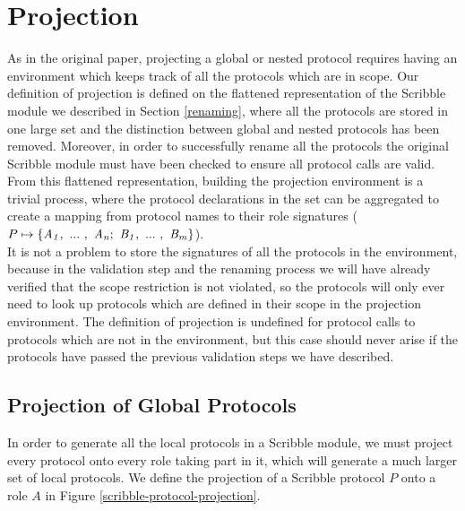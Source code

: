 \documentclass[12pt,twoside]{report}
\begin{document}
\section{Projection}\label{scribble-projection}
As in the original paper, projecting a global or nested protocol requires having an environment which keeps track of all the protocols which are in scope. Our definition of projection is defined on the flattened representation of the Scribble module we described in Section \ref{renaming}, where all the protocols are stored in one large set and the distinction between global and nested protocols has been removed. Moreover, in order to successfully rename all the protocols the original Scribble module must have been checked to ensure all protocol calls are valid. From this flattened representation, building the projection environment is a trivial process, where the protocol declarations in the set can be aggregated to create a mapping from protocol names to their role signatures ($P \mapsto \{\roles{A}{n};\ \roles{B}{m}\}$).\\

It is not a problem to store the signatures of all the protocols in the environment, because in the validation step and the renaming process we will have already verified that the scope restriction is not violated, so the protocols will only ever need to look up protocols which are defined in their scope in the projection environment. The definition of projection is undefined for protocol calls to protocols which are not in the environment, but this case should never arise if the protocols have passed the previous validation steps we have described.

\subsection{Projection of Global Protocols}

In order to generate all the local protocols in a Scribble module, we must project every protocol onto every role taking part in it, which will generate a much larger set of local protocols. We define the projection of a Scribble protocol $P$ onto a role $A$ in Figure \ref{scribble-protocol-projection}.
\end{document}
